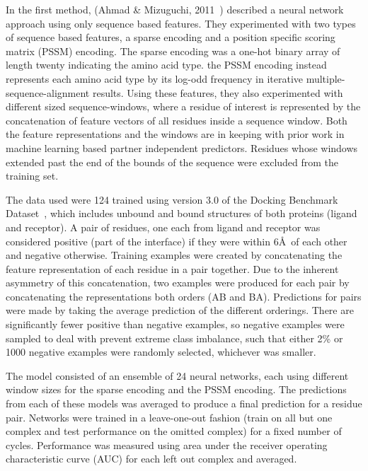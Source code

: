 In the first method, (Ahmad \& Mizuguchi, 2011~\cite{ahmad2011}) described a neural network approach using only sequence based features.
They experimented with two types of sequence based features, a sparse encoding and a position specific scoring matrix (PSSM) encoding.
The sparse encoding was a one-hot binary array of length twenty indicating the amino acid type.
the PSSM encoding instead represents each amino acid type by its log-odd frequency in iterative multiple-sequence-alignment results.
Using these features, they also experimented with different sized sequence-windows, where a residue of interest is represented by the concatenation of feature vectors of all residues inside a sequence window.
Both the feature representations and the windows are in keeping with prior work in machine learning based partner independent predictors.
Residues whose windows extended past the end of the bounds of the sequence were excluded from the training set.

The data used were 124 trained using version 3.0 of the Docking Benchmark Dataset~\cite{hwang2008}, which includes unbound and bound structures of both proteins (ligand and receptor).
A pair of residues, one each from ligand and receptor was considered positive (part of the interface) if they were within 6\AA~of each other and negative otherwise.
Training examples were created by concatenating the feature representation of each residue in a pair together.
Due to the inherent asymmetry of this concatenation, two examples were produced for each pair by concatenating the representations both orders (AB and BA).
Predictions for pairs were made by taking the average prediction of the different orderings.
There are significantly fewer positive than negative examples, so negative examples were sampled to deal with prevent extreme class imbalance, such that either 2\% or 1000 negative examples were randomly selected, whichever was smaller.

The model consisted of an ensemble of 24 neural networks, each using different window sizes for the sparse encoding and the PSSM encoding.
The predictions from each of these models was averaged to produce a final prediction for a residue pair.
Networks were trained in a leave-one-out fashion (train on all but one complex and test performance on the omitted complex) for a fixed number of cycles.
Performance was measured using area under the receiver operating characteristic curve (AUC) for each left out complex and averaged.

